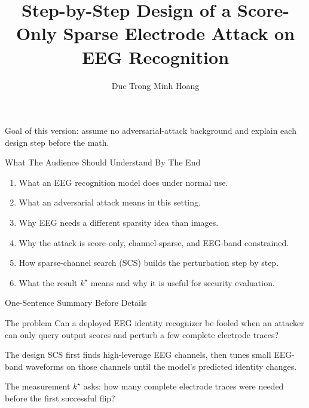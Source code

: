 \documentclass[aspectratio=169,11pt]{beamer}
\title[Step-by-Step SCS Design]{Step-by-Step Design of a Score-Only Sparse Electrode Attack on EEG Recognition}
\author{Duc Trong Minh Hoang}
\institute{INRS}
\date{}
\begin{document}
\begin{frame}
  \titlepage
  \vspace{-1em}
  \begin{center}
    \small
    Goal of this version: assume no adversarial-attack background and explain each design step before the math.
  \end{center}
\end{frame}

\begin{frame}{What The Audience Should Understand By The End}
\begin{enumerate}
  \item What an EEG recognition model does under normal use.
  \item What an adversarial attack means in this setting.
  \item Why EEG needs a different sparsity idea than images.
  \item Why the attack is score-only, channel-sparse, and EEG-band constrained.
  \item How sparse-channel search (SCS) builds the perturbation step by step.
  \item What the result \(k^\star\) means and why it is useful for security evaluation.
\end{enumerate}
\end{frame}

\begin{frame}{One-Sentence Summary Before Details}
\begin{block}{The problem}
Can a deployed EEG identity recognizer be fooled when an attacker can only query output scores and perturb a few complete electrode traces?
\end{block}

\begin{block}{The design}
SCS first finds high-leverage EEG channels, then tunes small EEG-band waveforms on those channels until the model's predicted identity changes.
\end{block}

\begin{block}{The measurement}
\(k^\star\) asks: how many complete electrode traces were needed before the first successful flip?
\end{block}
\end{frame}
\end{document}
